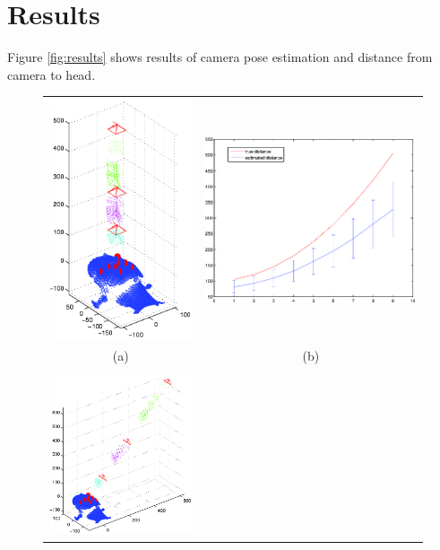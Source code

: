 \documentclass[runningheads]{llncs}
\begin{document}
\section{Results}
Figure \ref{fig:results} shows results of camera pose estimation and distance from camera to head.  
\begin{figure}[ht]
\begin{tabular}{cc}
\includegraphics[width=.45\linewidth]{resources/figures/cameraloc_frontal.png} &
\includegraphics[width=.45\linewidth]{resources/figures/errorbar_frontal.png} \\
(a) & (b) \\
\includegraphics[width=.45\linewidth]{resources/figures/cameraloc_3q.png} &

\end{tabular}
\end{figure}
\end{document}
